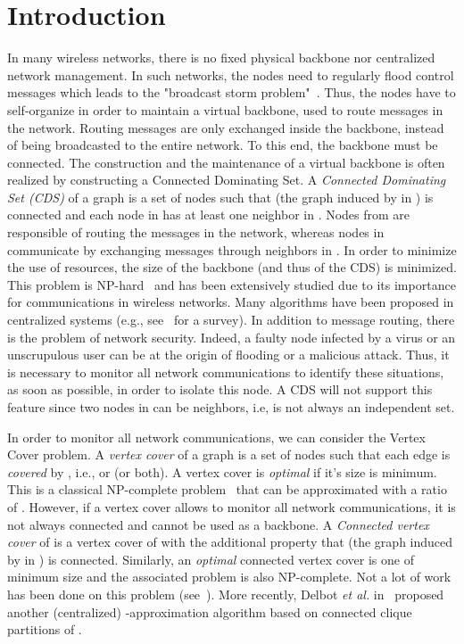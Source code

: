 \documentclass[11pt,letterpaper,onecolumn]{article}
\begin{document}
\section{Introduction}

In many wireless networks, there is no fixed physical backbone nor centralized network management. In such networks, the nodes need to regularly flood control messages which leads to the "broadcast  storm  problem"~\cite{NiTCS99}. Thus, the nodes have to self-organize in order to maintain a virtual backbone, used to route messages in the network. Routing messages are only exchanged inside the backbone, instead of being broadcasted to the entire network. To this end, the backbone must be connected.
The construction and the maintenance of a virtual backbone is often realized by constructing a Connected Dominating Set. A \emph{Connected Dominating Set (CDS)} of a graph  is a set of nodes  such that  (the graph induced by  in ) is connected and each node in  has at least one neighbor in . Nodes from  are responsible of routing the messages in the network, whereas nodes in  communicate by exchanging messages through neighbors in . In order to minimize the use of resources, the size of the backbone (and thus of the  CDS) is minimized. This problem is NP-hard~\cite{GJ79} and has been extensively studied due to its importance for communications in wireless networks. Many algorithms have been proposed in centralized systems (e.g., see~\cite{BlumDTC99} for a survey). In addition to message routing, there is the problem of network security. Indeed, a faulty node infected by a virus or an unscrupulous user can be at the origin of flooding or a malicious attack. Thus, it is necessary to monitor all network communications to identify these situations, as soon as possible, in order to isolate this node. A CDS  will not support this feature since two nodes in  can be neighbors, i.e,  is not always an independent set.

In order to monitor all network communications, we can consider the Vertex Cover problem. A \emph{vertex cover} of a graph  is a set of nodes  such that each edge  is \emph{covered} by , i.e.,  or  (or both). A vertex cover is \emph{optimal} if it's size is minimum. This is a classical NP-complete problem~\cite{GJ79} that can be approximated with a ratio of . However, if a vertex cover allows to monitor all network communications, it is not always connected and cannot be used as a backbone. A \emph{Connected vertex cover}  of  is a vertex cover of  with the additional property that  (the graph induced by  in ) is connected. Similarly, an \emph{optimal} connected vertex cover is one of minimum size and the associated problem is also NP-complete. Not a lot of work has been done on this problem (see~\cite{Savage82,EscoffierGouvesMonnot10}). More recently, Delbot \emph{et al.} in~\cite{DelbotLP13} proposed another (centralized) -approximation algorithm based on connected clique partitions of .
\end{document}

